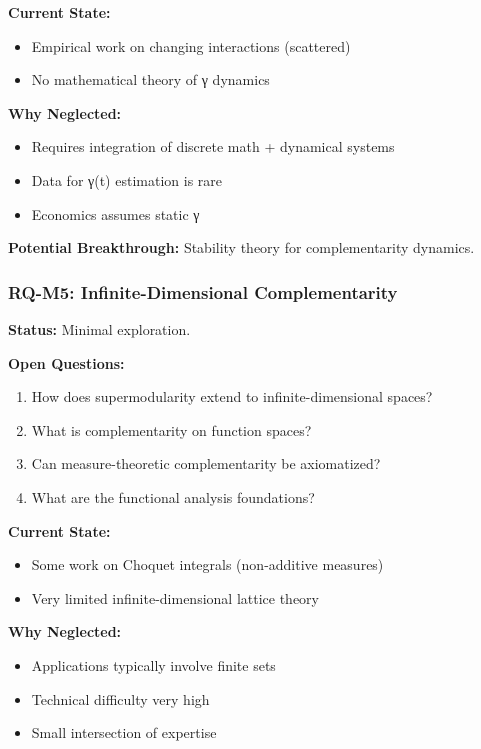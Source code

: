 \textbf{Current State:}
\begin{itemize}[noitemsep]
    \item Empirical work on changing interactions (scattered)
    \item No mathematical theory of γ dynamics
\end{itemize}

\textbf{Why Neglected:}
\begin{itemize}[noitemsep]
    \item Requires integration of discrete math + dynamical systems
    \item Data for γ(t) estimation is rare
    \item Economics assumes static γ
\end{itemize}

\textbf{Potential Breakthrough:} Stability theory for complementarity dynamics.

\subsubsection{RQ-M5: Infinite-Dimensional Complementarity}

\textbf{Status:} Minimal exploration.

\textbf{Open Questions:}
\begin{enumerate}[noitemsep]
    \item How does supermodularity extend to infinite-dimensional spaces?
    \item What is complementarity on function spaces?
    \item Can measure-theoretic complementarity be axiomatized?
    \item What are the functional analysis foundations?
\end{enumerate}

\textbf{Current State:}
\begin{itemize}[noitemsep]
    \item Some work on Choquet integrals (non-additive measures)
    \item Very limited infinite-dimensional lattice theory
\end{itemize}

\textbf{Why Neglected:}
\begin{itemize}[noitemsep]
    \item Applications typically involve finite sets
    \item Technical difficulty very high
    \item Small intersection of expertise
\end{itemize}


